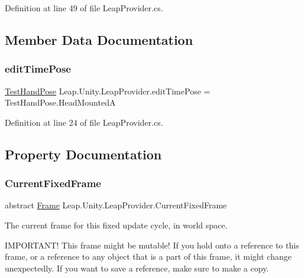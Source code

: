 Definition at line 49 of file Leap\+Provider.\+cs.



\subsection{Member Data Documentation}
\mbox{\label{class_leap_1_1_unity_1_1_leap_provider_a80150ace9cb1c6681fb2d41792ede8f3}} 
\subsubsection{\texorpdfstring{editTimePose}{editTimePose}}
{\footnotesize\ttfamily \mbox{\hyperlink{namespace_leap_1_1_unity_acd6a6baee36c0cbe733c12b87791f963}{Test\+Hand\+Pose}} Leap.\+Unity.\+Leap\+Provider.\+edit\+Time\+Pose = Test\+Hand\+Pose.\+Head\+MountedA}



Definition at line 24 of file Leap\+Provider.\+cs.



\subsection{Property Documentation}
\mbox{\label{class_leap_1_1_unity_1_1_leap_provider_a9aab77328326eff69b42cf009cc73d9a}} 
\subsubsection{\texorpdfstring{CurrentFixedFrame}{CurrentFixedFrame}}
{\footnotesize\ttfamily abstract \mbox{\hyperlink{class_leap_1_1_frame}{Frame}} Leap.\+Unity.\+Leap\+Provider.\+Current\+Fixed\+Frame\hspace{0.3cm}{\ttfamily [get]}}



The current frame for this fixed update cycle, in world space. 

I\+M\+P\+O\+R\+T\+A\+N\+T! This frame might be mutable! If you hold onto a reference to this frame, or a reference to any object that is a part of this frame, it might change unexpectedly. If you want to save a reference, make sure to make a copy. 

